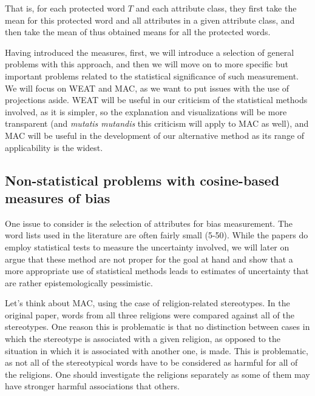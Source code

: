 \documentclass[
  10pt,
  dvipsnames,enabledeprecatedfontcommands, twocolumn]{scrartcl}
\begin{document}
\normalsize

\noindent That is, for each protected word \(T\) and each attribute
class, they first take the mean for this protected word and all
attributes in a given attribute class, and then take the mean of thus
obtained means for all the protected words.

Having introduced the measures, first, we will introduce a selection of
general problems with this approach, and then we will move on to more
specific but important problems related to the statistical significance
of such measurement. We will focus on WEAT and MAC, as we want to put
issues with the use of projections aside. WEAT will be useful in our
criticism of the statistical methods involved, as it is simpler, so the
explanation and visualizations will be more transparent (and
\emph{mutatis mutandis} this criticism will apply to MAC as well), and
MAC will be useful in the development of our alternative method as its
range of applicability is the widest.

\hypertarget{non-statistical-problems-with-cosine-based-measures-of-bias}{%
\subsection{Non-statistical problems with cosine-based measures of
bias}\label{non-statistical-problems-with-cosine-based-measures-of-bias}}

One issue to consider is the selection of attributes for bias
measurement. The word lists used in the literature are often fairly
small (5-50). While the papers do employ statistical
tests to measure the uncertainty involved, we will later on argue that
these method are not proper for the goal at hand and show that a more
appropriate use of statistical methods leads to estimates of uncertainty
that are rather epistemologically pessimistic.

Let's think about MAC, using the case of religion-related
stereotypes. In the
original paper, words from all three religions were compared against all
of the stereotypes. One reason this is problematic is that no
distinction between cases in which the stereotype is associated with a
given religion, as opposed to the situation in which it is associated
with another one, is made. This is problematic, as not all of the
stereotypical words have to be considered as harmful for all of the
religions. One should investigate the religions separately as some of
them may have stronger harmful associations that others.
\end{document}
